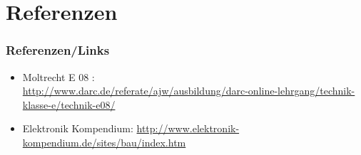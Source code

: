 \section*{Referenzen}
\begin{frame}
    \frametitle{Referenzen/Links}
    
    \footnotesize
    \begin{itemize}
        \item Moltrecht E 08 : \\
              \url{http://www.darc.de/referate/ajw/ausbildung/darc-online-lehrgang/technik-klasse-e/technik-e08/}
		\item Elektronik Kompendium:
			\url{http://www.elektronik-kompendium.de/sites/bau/index.htm}
    \end{itemize}

\end{frame}


